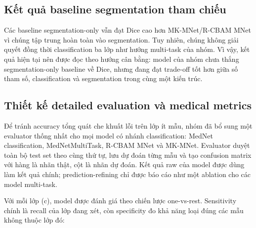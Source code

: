 \documentclass[12pt,a4paper]{article}
\begin{document}
\subsection{Kết quả baseline segmentation tham chiếu}

\begin{table}[H]
\centering
\caption{Một số baseline segmentation/multi-task tham chiếu trong artifact Colab}
\renewcommand{\arraystretch}{1.25}
\end{table}

Các baseline segmentation-only vẫn đạt Dice cao hơn MK-MNet/R-CBAM MNet vì chúng tập trung hoàn toàn vào segmentation. Tuy nhiên, chúng không giải quyết đồng thời classification ba lớp như hướng multi-task của nhóm. Vì vậy, kết quả hiện tại nên được đọc theo hướng cân bằng: model của nhóm chưa thắng segmentation-only baseline về Dice, nhưng đang đạt trade-off tốt hơn giữa số tham số, classification và segmentation trong cùng một kiến trúc.

\subsection{Thiết kế detailed evaluation và medical metrics}

Để tránh accuracy tổng quát che khuất lỗi trên lớp ít mẫu, nhóm đã bổ sung một evaluator thống nhất cho mọi model có nhánh classification: MedNet classification, MedNetMultiTask, R-CBAM MNet và MK-MNet. Evaluator duyệt toàn bộ test set theo cùng thứ tự, lưu dự đoán từng mẫu và tạo confusion matrix với hàng là nhãn thật, cột là nhãn dự đoán. Kết quả raw của model được dùng làm kết quả chính; prediction-refining chỉ được báo cáo như một ablation cho các model multi-task.

Với mỗi lớp (c), model được đánh giá theo chiến lược one-vs-rest. Sensitivity chính là recall của lớp đang xét, còn specificity đo khả năng loại đúng các mẫu không thuộc lớp đó:
\end{document}
